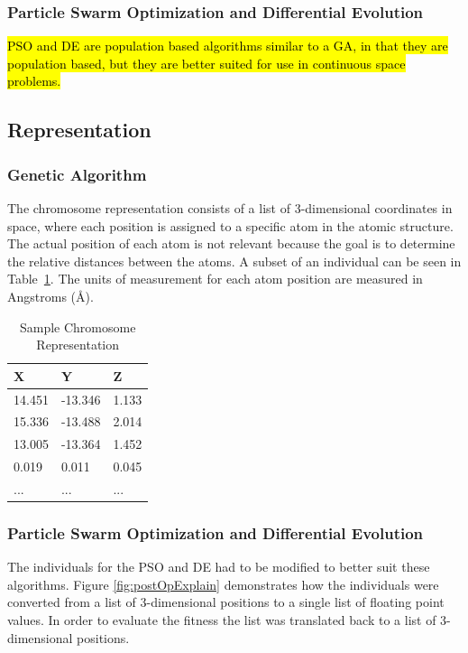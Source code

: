 \documentclass[conference]{IEEEtran}
\begin{document}
\subsubsection{Particle Swarm Optimization and Differential Evolution}

\hl{PSO and DE are population based algorithms similar to a GA, in that they are population based, but they are better suited for use in continuous space problems.}

\subsection{Representation}

\subsubsection{Genetic Algorithm}

The chromosome representation consists of a list of 3-dimensional coordinates in space, where each position is assigned to a specific atom in the atomic structure. The actual position of each atom is not relevant because the goal is to determine the relative distances between the atoms. A subset of an individual can be seen in Table~\ref{table:sampleChromosome}. The units of measurement for each atom position are measured in Angstroms (\AA).

\begin{table}
\caption{Sample Chromosome Representation}
\label{table:sampleChromosome}
\centering
\normalsize
\begin{tabular}{ | l | l | l |}
  \hline
    X & Y & Z \\ \hline
    14.451 & -13.346 & 1.133 \\ \hline
    15.336 & -13.488 & 2.014 \\ \hline
    13.005 & -13.364 & 1.452 \\ \hline
    0.019 & 0.011 & 0.045 \\ \hline
    ... & ... & ... \\ \hline
\end{tabular}
\end{table}

\subsubsection{Particle Swarm Optimization and Differential Evolution}

The individuals for the PSO and DE had to be modified to better suit these algorithms. Figure \ref{fig:postOpExplain} demonstrates how the individuals were converted from a list of 3-dimensional positions to a single list of floating point values. In order to evaluate the fitness the list was translated back to a list of 3-dimensional positions.
\end{document}

